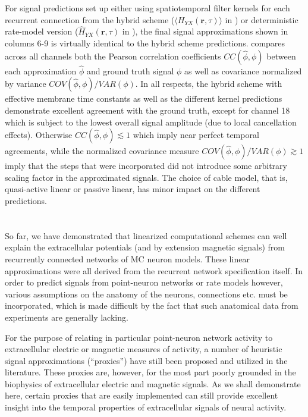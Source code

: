For signal predictions set up either using spatiotemporal filter kernels for each recurrent connection from the hybrid scheme ($\langle H_{YX}(\mathbf{r}, \tau) \rangle$ in ) or deterministic rate-model version  ($\hat{H}_{YX}(\mathbf{r}, \tau)$ in ), 
the final signal approximations shown in  columns 6-9 is virtually identical to the hybrid scheme predictions. 
 compares across all channels both the Pearson correlation coefficients $CC(\hat{\phi}, \phi)$ between each approximation $\hat{\phi}$ and ground truth signal $\phi$ as well as covariance normalized by variance $COV(\hat{\phi}, \phi)/VAR(\phi)$. 
In all respects, the hybrid scheme with effective membrane time constants as well as the different kernel predictions demonstrate excellent agreement with the ground truth, except for channel 18 which is subject to the lowest overall signal amplitude (due to local cancellation effects). 
Otherwise $CC(\hat{\phi}, \phi) \lesssim 1$ which imply near perfect temporal agreements, 
while the normalized covariance measure $COV(\hat{\phi}, \phi)/VAR(\phi) \gtrsim 1$ imply that the steps that were incorporated did not introduce some arbitrary scaling factor in the approximated signals. 
The choice of cable model, that is, quasi-active linear or passive linear, has minor impact on the different predictions. 


\section{}
\label{sec:Schemes:proxies}

So far, we have demonstrated that linearized computational schemes can well explain the extracellular potentials (and by extension magnetic signals) from recurrently connected networks of MC neuron models. 
These linear approximations were all derived from the recurrent network specification itself. 
In order to predict signals from point-neuron networks or rate models however, 
various assumptions on the anatomy of the neurons, connections etc. must be incorporated, 
which is made difficult by the fact that such anatomical data from experiments are generally lacking. 

For the purpose of relating in particular point-neuron network activity to extracellular electric or magnetic measures of activity,
a number of heuristic signal approximations (``proxies'') have still been proposed and utilized in the literature. 
These proxies are, however, for the most part poorly grounded in the biophysics of extracellular electric and magnetic signals. 
As we shall demonstrate here, certain proxies that are easily implemented can still provide excellent insight into the temporal properties of extracellular signals of neural activity.

